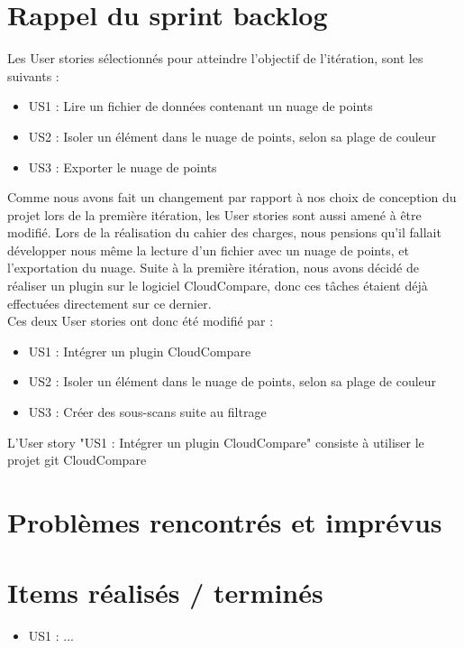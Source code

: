\documentclass[12pt,titlepage,french]{article}
\begin{document}
\section{Rappel du sprint backlog}

Les User stories sélectionnés pour atteindre l'objectif de l'itération, sont les suivants :

\begin{itemize}
  \item US1 : Lire un fichier de données contenant un nuage de points
  \item US2 : Isoler un élément dans le nuage de points, selon sa plage de couleur
  \item US3 : Exporter le nuage de points
\end{itemize}

Comme nous avons fait un changement par rapport à nos choix de conception du projet lors de la première itération, les User stories sont aussi amené à être modifié. Lors de la réalisation du cahier des charges, nous pensions qu'il fallait développer nous même la lecture d'un fichier avec un nuage de points, et l'exportation du nuage. Suite à la première itération, nous avons décidé de réaliser un plugin sur le logiciel CloudCompare, donc ces tâches étaient déjà effectuées directement sur ce dernier. \\
Ces deux User stories ont donc été modifié par : 
\begin{itemize}
  \item US1 : Intégrer un plugin CloudCompare
  \item US2 : Isoler un élément dans le nuage de points, selon sa plage de couleur
  \item US3 : Créer des sous-scans suite au filtrage
\end{itemize}

L'User story "US1 : Intégrer un plugin CloudCompare" consiste à utiliser le projet git CloudCompare 

\section{Problèmes rencontrés et imprévus}

\section{Items réalisés / terminés}

\begin{itemize}
  \item US1 : ...
\end{itemize}
\end{document}
